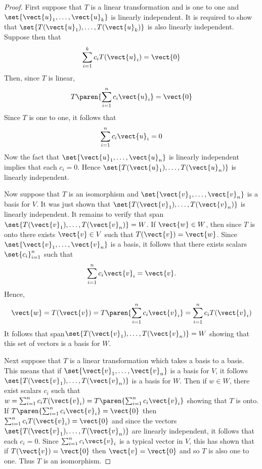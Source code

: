 \begin{proof}First suppose that $T$ is a linear transformation and is one to one
and $\set{\vect{u}_{1},\ldots,\vect{u}_{k}} $ is linearly
independent. It is required to show that $\set{T(\vect{u}_{1}),\ldots,T(\vect{
u}_{k})} $ is also linearly independent. Suppose then that 
\begin{equation*}
\sum_{i=1}^{k}c_{i}T(\vect{u}_{i})=\vect{0}
\end{equation*}
Then, since $T$ is linear, 
\begin{equation*}
T\paren{\sum_{i=1}^{n}c_{i}\vect{u}_{i}} =\vect{0}
\end{equation*}
Since $T$ is one to one, it follows that 
\begin{equation*}
\sum_{i=1}^{n}c_{i}\vect{u}_{i}=0
\end{equation*}
Now the fact that $\set{\vect{u}_{1},\ldots,\vect{u}_{n}} $ is
linearly independent implies that each $c_{i}=0$. Hence $\set{T(\vect{u}
_{1}),\ldots,T(\vect{u}_{n})} $ is linearly independent.

Now suppose that $T$ is an isomorphism and $\set{\vect{v}_{1},\ldots,\vect{
v}_{n}} $ is a basis for $V$. It was just shown that $\set{T(\vect{v}
_{1}),\ldots,T(\vect{v}_{n})} $ is linearly independent. It remains to
verify that span$\set{T(\vect{v}_{1}),\ldots,T(\vect{v}_{n})}=W$. If $\vect{w}\in W$, then since $T$ is onto there
exists $\vect{v}\in V$ such that $T(\vect{v})=\vect{w}$. Since $\set{\vect{v}
_{1},\ldots,\vect{v}_{n}} $ is a basis, it follows that there exists
scalars $\set{c_{i}} _{i=1}^{n}$ such that 
\begin{equation*}
\sum_{i=1}^{n}c_{i}\vect{v}_{i}=\vect{v}.
\end{equation*}
Hence, 
\begin{equation*}
\vect{w}=T(\vect{v})=T\paren{\sum_{i=1}^{n}c_{i}\vect{v}_{i}}
=\sum_{i=1}^{n}c_{i}T(\vect{v}_{i})
\end{equation*}
It follows that span$\set{T(\vect{v}_{1}),\ldots, T(\vect{v}_{n})} =W$ showing that this set of vectors is a
basis for $W$.

Next suppose that $T$ is a linear transformation which takes a basis to a basis. This means that if $\set{\vect{v}_{1},\ldots,\vect{v}_{n}} $ is a basis for $V$, it
follows $\set{T(\vect{v}_{1}),\ldots,T(\vect{v}_{n})} $ is a basis for $
W$. Then if $w\in W$, there exist scalars $c_{i}$ such that $
w=\sum_{i=1}^{n}c_{i}T(\vect{v}_{i})=T\paren{\sum_{i=1}^{n}c_{i}\vect{v}_{i}} $
showing that $T$ is onto. If $T\paren{\sum_{i=1}^{n}c_{i}\vect{v}_{i}} =\vect{0}$
then $\sum_{i=1}^{n}c_{i}T(\vect{v}_{i})=\vect{0}$ and since the vectors $\set{T(\vect{v}
_{1}),\ldots,T(\vect{v}_{n})} $ are linearly independent, it follows
that each $c_{i}=0$. Since $\sum_{i=1}^{n}c_{i}\vect{v}_{i}$ is a typical vector in 
$V$, this has shown that if $T(\vect{v})=\vect{0}$ then $\vect{v}=\vect{0}$ and so $T$ is also one to one.
Thus $T$ is an isomorphism. 
\end{proof}

